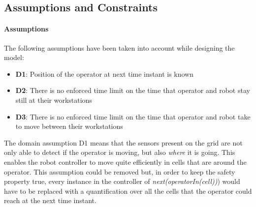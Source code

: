 \subsection{Assumptions and Constraints}

\paragraph{Assumptions}
\newcommand{\DI}{\textbf{D1}: Position of the operator at next time instant is known}
\newcommand{\DII}{\textbf{D2}: There is no enforced time limit on the time that operator and robot stay still at their workstations}
\newcommand{\DIII}{\textbf{D3}: There is no enforced time limit on the time that operator and robot take to move between their workstations}
\newcommand{\DIV}{\textbf{D4}: }
\newcommand{\DV}{\textbf{D5}: }
\newcommand{\DVI}{\textbf{D6}: }
\newcommand{\DVII}{\textbf{D7}: }
\newcommand{\DVIII}{\textbf{D8}: }
\newcommand{\DIX}{\textbf{D9}: }
\newcommand{\DX}{\textbf{D10}: }
\newcommand{\DXI}{\textbf{D11}: }

The following assumptions have been taken into account while designing the model:
\newline\begin{itemize}
	\item  \DI
	\item  \DII
	\item  \DIII
\end{itemize}

The domain assumption D1 means that the sensors present on the grid are not only able to detect if the operator is moving, but also \textit{where} it is going. This enables the robot controller to move quite efficiently in cells that are around the operator. This assumption could be removed but, in order to keep the safety property true, every instance in the controller of \textit{next(operatorIn(cell))}) would have to be replaced with a quantification over all the cells that the operator could reach at the next time instant.
\newpage

